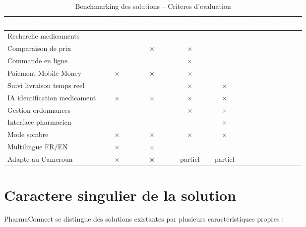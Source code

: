 \documentclass[12pt,a4paper]{report}
\newcommand{\cmark}{\textcolor{vertpharma}{\checkmark}}
\newcommand{\xmark}{\textcolor{red!60}{$\times$}}
\begin{document}
\begin{table}[ht]
\centering
\caption{Benchmarking des solutions -- Criteres d'evaluation}
\renewcommand{\arraystretch}{1.4}
{\small
\begin{tabularx}{\textwidth}{|X|c|c|c|c|c|}
\hline
\rowcolor{grisfonc}
\textcolor{white}{\textbf{Fonctionnalite}} & \textcolor{white}{\textbf{Amazon}} & \textcolor{white}{\textbf{Capsule}} & \textcolor{white}{\textbf{mPharma}} & \textcolor{white}{\textbf{Jumia}} & \textcolor{white}{\textbf{PharmaConnect}} \\ \hline
Recherche medicaments & \cmark & \cmark & \cmark & \cmark & \cmark \\ \hline
Comparaison de prix & \cmark & \xmark & \xmark & \cmark & \cmark \\ \hline
Commande en ligne & \cmark & \cmark & \xmark & \cmark & \cmark \\ \hline
Paiement Mobile Money & \xmark & \xmark & \xmark & \cmark & \cmark \\ \hline
Suivi livraison temps reel & \cmark & \cmark & \xmark & \xmark & \cmark \\ \hline
IA identification medicament & \xmark & \xmark & \xmark & \xmark & \cmark \\ \hline
Gestion ordonnances & \cmark & \cmark & \xmark & \xmark & \cmark \\ \hline
Interface pharmacien & \cmark & \cmark & \cmark & \xmark & \cmark \\ \hline
Mode sombre & \xmark & \xmark & \xmark & \xmark & \cmark \\ \hline
Multilingue FR/EN & \xmark & \xmark & \cmark & \cmark & \cmark \\ \hline
Adapte au Cameroun & \xmark & \xmark & partiel & partiel & \cmark \\ \hline
\end{tabularx}
}
\end{table}

\section{Caractere singulier de la solution}

PharmaConnect se distingue des solutions existantes par plusieurs caracteristiques propres :
\end{document}
